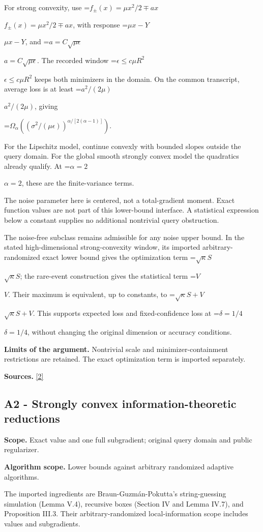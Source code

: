 \documentclass[10pt,a4paper]{article}
\newcommand{\AtlasMath}[1]{\par\begingroup\centering\setbox0=\hbox{$\displaystyle #1$}\ifdim\wd0>1.4\linewidth\typeout{ATLAS WIDE FORMULA: \the\wd0}\fi\ifdim\wd0>\linewidth\resizebox{\linewidth}{!}{\box0}\else\box0\fi\par\endgroup}
\newcommand{\AtlasInlineMath}[1]{\begingroup\setbox0=\hbox{$#1$}\ifdim\wd0>.4\linewidth\endgroup\AtlasMath{#1}\else\endgroup$#1$\fi}
\begin{document}
For strong convexity, use \AtlasInlineMath{f_\pm(x)=\mu x^2/2\mp ax}, with response \AtlasInlineMath{\mu x-Y}, and \AtlasInlineMath{a=C\sqrt{\mu\epsilon}}. The recorded window \AtlasInlineMath{\epsilon\le c\mu R^2} keeps both minimizers in the domain. On the common transcript, average loss is at least \AtlasInlineMath{a^2/(2\mu)}, giving

\AtlasMath{\Omega_\alpha((\sigma^2/(\mu\epsilon))^{\alpha/[2(\alpha-1)]}).}

For the Lipschitz model, continue convexly with bounded slopes outside the query domain. For the global smooth strongly convex model the quadratics already qualify. At \AtlasInlineMath{\alpha=2}, these are the finite-variance terms.

The noise parameter here is centered, not a total-gradient moment. Exact function values are not part of this lower-bound interface. A statistical expression below a constant supplies no additional nontrivial query obstruction.

The noise-free subclass remains admissible for any noise upper bound. In the stated high-dimensional strong-convexity window, its imported arbitrary-randomized exact lower bound gives the optimization term \AtlasInlineMath{\sqrt\kappa S}; the rare-event construction gives the statistical term \AtlasInlineMath{V}. Their maximum is equivalent, up to constants, to \AtlasInlineMath{\sqrt\kappa S+V}. This supports expected loss and fixed-confidence loss at \AtlasInlineMath{\delta=1/4}, without changing the original dimension or accuracy conditions.

\textbf{Limits of the argument.} Nontrivial scale and minimizer-containment restrictions are retained. The exact optimization term is imported separately.

\textbf{Sources.} \href{https://arxiv.org/pdf/2609.10874}{[2]}

\subsection{A2 - Strongly convex information-theoretic reductions}
\textbf{Scope.} Exact value and one full subgradient; original query domain and public regularizer.

\textbf{Algorithm scope.} Lower bounds against arbitrary randomized adaptive algorithms.

The imported ingredients are Braun-Guzmán-Pokutta's string-guessing simulation (Lemma V.4), recursive boxes (Section IV and Lemma IV.7), and Proposition III.3. Their arbitrary-randomized local-information scope includes values and subgradients.
\end{document}
